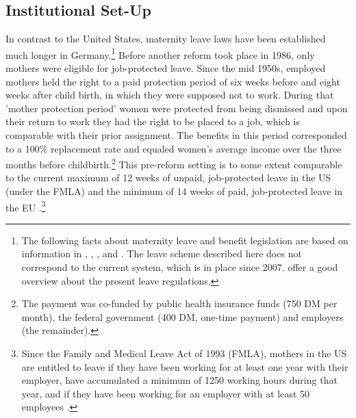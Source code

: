 \documentclass[11pt, a4paper,draft]{article} %
\begin{document}
\subsection[Reform]{Institutional Set-Up}
In contrast to the United States, maternity leave laws have been established much longer in Germany.\footnote{The following facts about maternity leave and benefit legislation are based on information in \cite{DIW2002}, \cite{schonberg2014expansions}, \cite{Dustmann2012}, and \cite{zmarzlik1999mutterschutzgesetz}. The leave scheme described here does not correspond to the current system, which is in place since 2007. \cite{Kluve2013} offer a good overview about the present leave regulations.} Before another reform took place in 1986, only mothers were eligible for job-protected leave. Since the mid 1950s, employed mothers held the right to a paid protection period of six weeks before and eight weeks after child birth, in which they were supposed not to work. During that 'mother protection period' women were protected from being dismissed and upon their return to work they had the right to be placed to a job, which is comparable with their prior assignment. The benefits in this period corresponded to a 100\% replacement rate and equaled women's average income over the three months before childbirth.\footnote{The payment was co-funded by public health insurance funds (750 DM per month), the federal government (400 DM, one-time payment) and employers (the remainder).} This pre-reform setting is to some extent comparable to the current maximum of 12 weeks of unpaid, job-protected leave in the US (under the FMLA) and the minimum of 14 weeks of paid, job-protected leave in the EU \citep{guertzgen2018}.\footnote{Since the Family and Medical Leave Act of 1993 (FMLA), mothers in the US are entitled to leave if they have been working for at least one year with their employer, have accumulated a minimum of 1250 working hours during that year, and if they have been working for an employer with at least 50 employees \citep{baum2003effect}.} \newline
\end{document}
